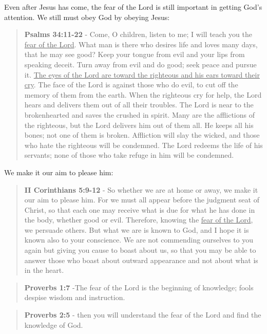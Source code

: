 \documentclass[11pt]{article}
\begin{document}
Even after Jesus has come, the fear of the Lord is still important in getting God's attention. We still must obey God by obeying Jesus:

\begin{quote}
\textbf{Psalms 34:11-22} - Come, O children, listen to me; I will teach you the \uline{fear of the Lord}. What man is there who desires life and loves many days, that he may see good? Keep your tongue from evil and your lips from speaking deceit. Turn away from evil and do good; seek peace and pursue it. \uline{The eyes of the Lord are toward the righteous and his ears toward their cry}. The face of the Lord is against those who do evil, to cut off the memory of them from the earth. When the righteous cry for help, the Lord hears and delivers them out of all their troubles. The Lord is near to the brokenhearted and saves the crushed in spirit. Many are the afflictions of the righteous, but the Lord delivers him out of them all. He keeps all his bones; not one of them is broken. Affliction will slay the wicked, and those who hate the righteous will be condemned. The Lord redeems the life of his servants; none of those who take refuge in him will be condemned.
\end{quote}

We make it our aim to please him:

\begin{quote}
\textbf{II Corinthians 5:9-12} - So whether we are at home or away, we make it our aim to please him. For we must all appear before the judgment seat of Christ, so that each one may receive what is due for what he has done in the body, whether good or evil. Therefore, knowing the \uline{fear of the Lord}, we persuade others. But what we are is known to God, and I hope it is known also to your conscience. We are not commending ourselves to you again but giving you cause to boast about us, so that you may be able to answer those who boast about outward appearance and not about what is in the heart.
\end{quote}

\begin{quote}
\textbf{Proverbs 1:7} -The fear of the Lord is the beginning of knowledge; fools despise wisdom and instruction.
\end{quote}

\begin{quote}
\textbf{Proverbs 2:5} - then you will understand the fear of the Lord and find the knowledge of God.
\end{quote}
\end{document}
